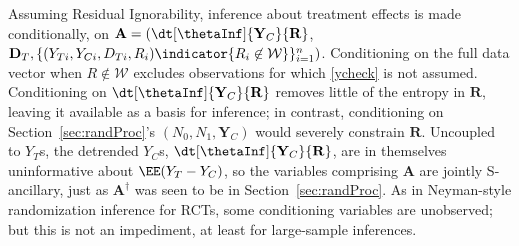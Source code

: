 \sloppy
Assuming Residual Ignorability, inference about treatment effects is
made conditionally, on
$\mathbf{A}= (\dt[\thetaInf]{\mathbf{Y}_{C}}{ \mathbf{R}}$, $\mathbf{D}_{T},
\{(Y_{Ti}, Y_{Ci}, D_{Ti}, R_{i}) \indicator{{R}_{i} \not\in
  \mathcal{W}}\}_{i=1}^{n})$.
Conditioning on the full data vector when $R \not\in \mathcal{W}$
excludes observations for which \eqref{ycheck} is not assumed.
Conditioning on
$\dt[\thetaInf]{\mathbf{Y}_{C}}{ \mathbf{R}}$
removes little of the entropy
in $\mathbf{R}$, leaving it available as a basis for inference; in
contrast, conditioning on Section~\ref{sec:randProc}'s $(N_{0}, N_{1}, \mathbf{Y}_{C})$ would
severely constrain $\mathbf{R}$.
Uncoupled to $Y_{T}$s, the detrended  $Y_{C}$s,
$\dt[\thetaInf]{\mathbf{Y}_{C}}{ \mathbf{R}}$,
are in themselves uninformative about $\EE(Y_{T} - Y_{C})$, so
the variables comprising $\mathbf{A}$ are jointly
S-ancillary, just as $\mathbf{A}^{\dagger}$ was seen to be
in Section~\ref{sec:randProc}.  As in Neyman-style randomization inference for RCTs, some conditioning variables are
unobserved; but this is not an impediment, at least for large-sample
inferences.



